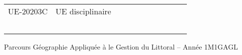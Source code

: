 \documentclass[a4paper,11pt]{article}
\begin{document}
{{\begin{tabular}{lllllllllll}
\rowcolor[HTML]{C0C0C0} 
UE-20203C                      & UE disciplinaire                                   &                           &                           &                           &                                    &                             &                             &                                    &                                  &                                  \\
                               &                                                    &                           &                           &                           &                                    &                             &                             &                                    &                                  &                                  \\
                               &                                                    &                           &                           &                           &                                    &                             &                             &                                    &                                  &                                  \\
                               &                                                    &                           &                           &                           &                                    &                             &                             &                                    &                                  &                                  \\
                               &                                                    &                           &                           &                           &                                    &                             &                             &                                    &                                  &                                  \\
                               &                                                    &                           &                           &                           &                                    &                             &                             &                                    &                                  &                                 
\end{tabular}
}
}{Parcours Géographie Appliquée à le Gestion du Littoral -- Année 1}{M1GAGL}
\end{document}
